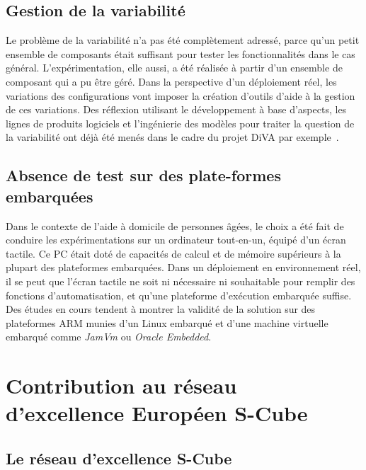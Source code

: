 \subsection{Gestion de la variabilité}
Le problème de la variabilité n'a pas été complètement adressé, parce qu'un petit ensemble de composants était suffisant pour tester les fonctionnalités dans le cas général. L'expérimentation, elle aussi, a été réalisée à partir d'un ensemble de composant qui a pu être géré. Dans la perspective d'un déploiement réel, les variations des configurations vont imposer la création d'outils d'aide à la gestion de ces variations. Des réflexion utilisant le développement à base d'aspects, les lignes de produits logiciels et l'ingénierie des modèles pour traiter la question de la variabilité ont déjà été menés dans le cadre du projet DiVA par exemple~\cite{Morin08d}.

\subsection{Absence de test sur des plate-formes embarquées}

Dans le contexte de l'aide à domicile de personnes âgées, le choix a été fait de conduire les expérimentations sur un ordinateur tout-en-un, équipé d'un écran tactile. Ce PC était doté de capacités de calcul et de mémoire supérieurs à la plupart des plateformes embarquées. Dans un déploiement en environnement réel, il se peut que l'écran tactile ne soit ni nécessaire ni souhaitable pour remplir des fonctions d'automatisation, et qu'une plateforme d'exécution  embarquée suffise. Des études en cours tendent à montrer la validité de la solution sur des plateformes ARM munies d'un Linux embarqué et d'une machine virtuelle embarqué comme {\it JamVm} ou {\it Oracle Embedded}. 


\section{Contribution au réseau d'excellence Européen S-Cube}

\subsection{Le réseau d'excellence S-Cube}

